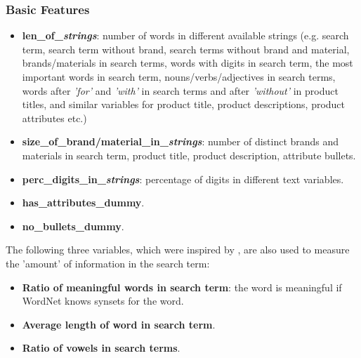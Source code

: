 \documentclass[12pt]{article}
\begin{document}
\subsubsection{Basic Features}
\label{subsubsec:Basic_Features_IandK}
\begin{itemize}
\item \textbf{len\_of\_\emph{strings}}: number of words in different available strings (e.g. search term, search term without brand, search terms without brand and material, brands/materials in search terms, words with digits in search term, the most important words in search term, nouns/verbs/adjectives in search terms, words after \emph{'for'} and \emph{'with'} in search terms and after \emph{'without'} in product titles, and similar variables for product title, product descriptions, product attributes etc.)
\item \textbf{size\_of\_brand/material\_in\_\emph{strings}}: number of distinct brands and materials in search term, product title, product description, attribute bullets.
\item \textbf{perc\_digits\_in\_\emph{strings}}: percentage of digits in different text variables.
\item \textbf{has\_attributes\_dummy}.
\item \textbf{no\_bullets\_dummy}.
\end{itemize}

The following three variables, which were inspired by \cite{dato:beatthebenchmark}, are also used to measure the 'amount' of information in the search term:
\begin{itemize}
\item \textbf{Ratio of meaningful words in search term}: the word is meaningful if WordNet knows synsets for the word.
\item \textbf{Average length of word in search term}.
\item \textbf{Ratio of vowels in search terms}.
\end{itemize}
\end{document}
